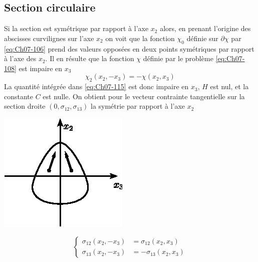 \subsection{Section circulaire}
Si la section est symétrique par rapport à l'axe $x_2$ alors, en prenant l'origine des abscisses curvilignes sur l'axe $x_2$ on voit que la fonction $\chi_0$ définie sur $\partial \chi$ par \eqref{eq:Ch07-106} prend des valeurs opposées en deux points symétriques par rapport à l'axe des $x_2$.
Il en résulte que la fonction $\chi$ définie par le problème \eqref{eq:Ch07-108} est impaire en $x_3$
\begin{equation}
    \chi_2 (x_2,-x_3) = - \chi (x_2, x_3)
    \label{eq:Ch07-118}
\end{equation}
La quantité intégrée dans \eqref{eq:Ch07-115} est donc impaire en $x_3$, $H$ est nul, et la constante $C$ est nulle.
On obtient pour le vecteur contrainte tangentielle sur la section droite $\left( 0,\sigma_{12}, \sigma_{13} \right)$ la symétrie par rapport à l'axe $x_2$
\begin{multicols}{2}
    \begin{center}
        \includegraphics{../images/T1_Ch07-20}
    \end{center}
    \columnbreak
    \begin{equation}
        \left\{
        \begin{aligned}
            \sigma_{12} (x_2, -x_3) &= \sigma_{12} (x_2, x_3) \\
            \sigma_{13} (x_2, -x_3) &= -\sigma_{13} (x_2, x_3)
        \end{aligned}
        \right.
        \label{eq:Ch07-119}
    \end{equation}
\end{multicols}

